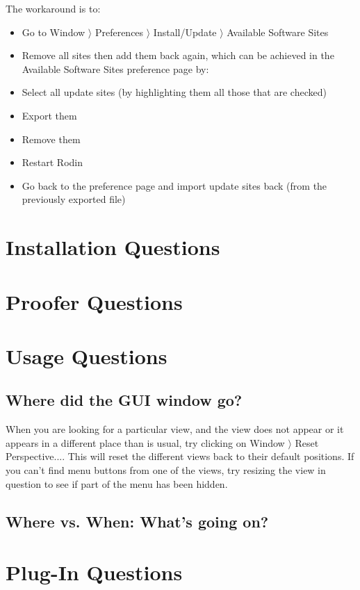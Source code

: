 The workaround is to: 

\begin{itemize}
	\item Go to \textsf{Window $\rangle$ Preferences $\rangle$ Install/Update $\rangle$ Available Software Sites} 
	\item Remove all sites then add them back again, which can be achieved in the \textsf{Available Software Sites} preference page by: 
	\item Select all update sites (by highlighting them all those that are checked) 
	\item Export them 
	\item Remove them
	\item Restart Rodin
	\item Go back to the preference page and import update sites back (from the previously exported file) 
\end{itemize}

\section{Installation Questions}

\section{Proofer Questions}

\section{Usage Questions}

\subsection{Where did the GUI window go?}

When you are looking for a particular view, and the view does not appear or it appears in a different place than is usual, try clicking on \textsf{Window $\rangle $ Reset Perspective...}. This will reset the different views back to their default positions. If you can't find menu buttons from one of the views, try resizing the view in question to see if part of the menu has been hidden.

\subsection{Where vs. When: What's going on?}

\section{Plug-In Questions}
